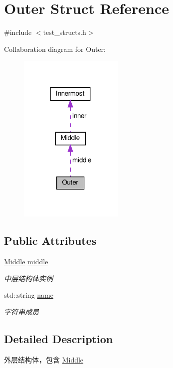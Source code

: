 \hypertarget{structOuter}{}\section{Outer Struct Reference}
\label{structOuter}


{\ttfamily \#include $<$test\+\_\+structs.\+h$>$}



Collaboration diagram for Outer\+:\nopagebreak
\begin{figure}[H]
\begin{center}
\leavevmode
\includegraphics[width=142pt]{structOuter__coll__graph}
\end{center}
\end{figure}
\subsection*{Public Attributes}
\begin{DoxyCompactItemize}
\item 
\hyperlink{structMiddle}{Middle} \hyperlink{structOuter_adc81b43edf9dbacead62a66d84ea8165}{middle}
\begin{DoxyCompactList}\small\item\em 中层结构体实例 \end{DoxyCompactList}\item 
std\+::string \hyperlink{structOuter_a59d89e71f28671cdc6213f0db73d4034}{name}
\begin{DoxyCompactList}\small\item\em 字符串成员 \end{DoxyCompactList}\end{DoxyCompactItemize}


\subsection{Detailed Description}
外层结构体，包含 \hyperlink{structMiddle}{Middle} 


